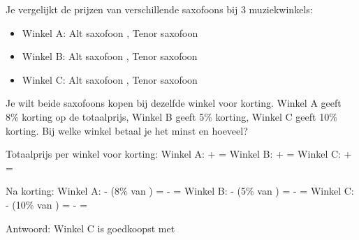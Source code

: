 \begin{opgave}
Je vergelijkt de prijzen van verschillende saxofoons bij 3 muziekwinkels:

\begin{itemize}
\item Winkel A: Alt saxofoon , Tenor saxofoon 
\item Winkel B: Alt saxofoon , Tenor saxofoon 
\item Winkel C: Alt saxofoon , Tenor saxofoon 
\end{itemize}

Je wilt beide saxofoons kopen bij dezelfde winkel voor korting. Winkel A geeft
8\% korting op de totaalprijs, Winkel B geeft 5\% korting, Winkel C geeft 10\%
korting. Bij welke winkel betaal je het minst en hoeveel?
\end{opgave}

\begin{oplossing}
Totaalprijs per winkel voor korting:
Winkel A:  +  = 
Winkel B:  +  = 
Winkel C:  +  = 

Na korting:
Winkel A:  - (8\% van ) =  -  = 
Winkel B:  - (5\% van ) =  -  = 
Winkel C:  - (10\% van ) =  -  = 

Antwoord: Winkel C is goedkoopst met 
\end{oplossing}